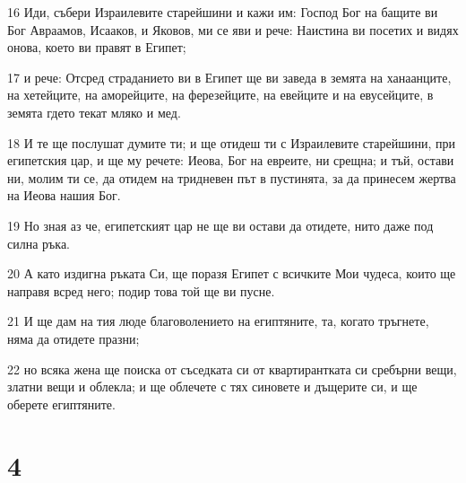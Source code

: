 \par 16 Иди, събери Израилевите старейшини и кажи им: Господ Бог на бащите ви Бог Авраамов, Исааков, и Яковов, ми се яви и рече: Наистина ви посетих и видях онова, което ви правят в Египет;
\par 17 и рече: Отсред страданието ви в Египет ще ви заведа в земята на ханаанците, на хетейците, на аморейците, на ферезейците, на евейците и на евусейците, в земята гдето текат мляко и мед.
\par 18 И те ще послушат думите ти; и ще отидеш ти с Израилевите старейшини, при египетския цар, и ще му речете: Иеова, Бог на евреите, ни срещна; и тъй, остави ни, молим ти се, да отидем на тридневен път в пустинята, за да принесем жертва на Иеова нашия Бог.
\par 19 Но зная аз че, египетският цар не ще ви остави да отидете, нито даже под силна ръка.
\par 20 А като издигна ръката Си, ще поразя Египет с всичките Мои чудеса, които ще направя всред него; подир това той ще ви пусне.
\par 21 И ще дам на тия люде благоволението на египтяните, та, когато тръгнете, няма да отидете празни;
\par 22 но всяка жена ще поиска от съседката си от квартирантката си сребърни вещи, златни вещи и облекла; и ще облечете с тях синовете и дъщерите си, и ще оберете египтяните.

\chapter{4}


